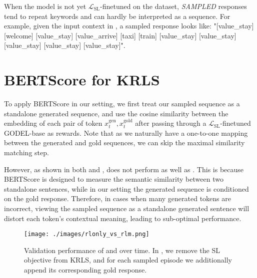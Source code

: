 When the model is not yet $\mathcal{L}_{\mathrm{SL}}$-finetuned on the dataset, \emph{SAMPLED} responses tend to repeat keywords and can hardly be interpreted as a sequence. For example, given the input context in , a sampled response looks like: "[value\_stay] [welcome] [value\_stay] [value\_arrive] [taxi] [train] [value\_stay] [value\_stay] [value\_stay] [value\_stay] [value\_stay]".
\section{BERTScore for KRLS}
\label{sec:BERTScore for KRLS}
To apply BERTScore in our setting, we first treat our sampled sequence as a standalone generated sequence, and use the cosine similarity between the embedding of each pair of token $x^{\mathrm{gen}}_t, x^{\mathrm{gold}}_t$ after passing through a $\mathcal{L}_{\mathrm{SL}}$-finetuned GODEL-base as rewards. Note that as we naturally have a one-to-one mapping between the generated and gold sequences, we can skip the maximal similarity matching step.

However, as shown in both  and ,  does not perform as well as . This is because BERTScore is designed to measure the semantic similarity between two standalone sentences, while in our setting the generated sequence is conditioned on the gold response. Therefore, in cases when many generated tokens are incorrect, viewing the sampled sequence as a standalone generated sentence will distort each token's contextual meaning, leading to sub-optimal performance.
\begin{figure}[!h]
  \centering
  \texttt{[image: ./images/rlonly\_vs\_rlm.png]}
  \caption{Validation performance of  and  over time. In , we remove the SL objective from KRLS, and for each sampled episode we additionally append its corresponding gold response.}
  \label{fig:rl_only_vs_krls}
\end{figure}
\begin{table}[h]
  \centering
  \caption{Performance of individual components of the KRLS Algorithm when trained directly from backbone.}
  \label{tbl:ablation_study_large}
\end{table}
